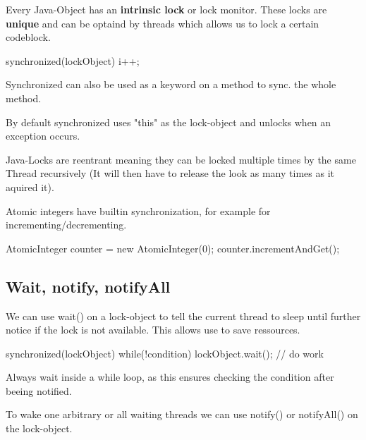 Every Java-Object has an \textbf{intrinsic lock} or lock monitor. These locks are \textbf{unique} and can be optaind by
threads which allows us to lock a certain codeblock. 

\begin{codeexample}
synchronized(lockObject) {
    i++;
}
\end{codeexample}

\begin{remark}
Synchronized can also be used as a keyword on a method to sync. the whole method.
\end{remark}

\begin{remark}
By default synchronized uses "this" as the lock-object and unlocks when an exception occurs.
\end{remark}

\begin{remark}
Java-Locks are reentrant meaning they can be locked multiple times by the same Thread recursively (It
will then have to release the look as many times as it aquired it).            
\end{remark}

Atomic integers have builtin synchronization, for example for incrementing/decrementing.

\begin{codeexample}
AtomicInteger counter = new AtomicInteger(0);
counter.incrementAndGet();
\end{codeexample}

\subsection{Wait, notify, notifyAll}

We can use wait() on a lock-object to tell the current thread to sleep until further notice if the lock is
not available. This allows use to save ressources.

\begin{codeexample}
synchronized(lockObject) {
    while(!condition) {
        lockObject.wait();
    }
    // do work
} 
\end{codeexample}

\begin{important}
Always wait inside a while loop, as this ensures checking the condition after beeing notified.
\end{important}

To wake one arbitrary or all waiting threads we can use notify() or notifyAll() on the lock-object.

